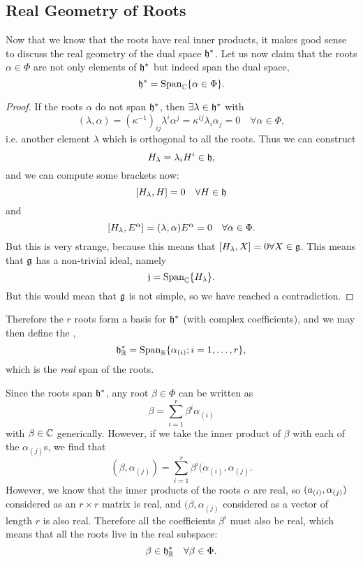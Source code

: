 \subsection*{Real Geometry of Roots} Now that we know that the roots have real inner products, it makes good sense to discuss the real geometry of the dual space $\mathfrak{h}^*$. Let us now claim that the roots $\alpha \in \Phi$ are not only elements of $\mathfrak{h}^*$ but indeed span the dual space,
$$\mathfrak{h}^*=\text{Span}_{\mathbb{C}}\{\alpha\in\Phi\}.$$
\begin{proof}
If the roots $\alpha$ do not span $\mathfrak{h}^*$, then
$\exists \lambda \in \mathfrak{h}^*$ with
$$(\lambda,\alpha)=(\kappa^{-1})_{ij}\lambda^i \alpha^j = \kappa^{ij} \lambda_i \alpha_j=0 \quad \forall \alpha \in \Phi,$$
i.e. another element $\lambda$ which is orthogonal to all the roots. Thus we can construct
$$H_\lambda=\lambda_i H^i \in \mathfrak{h},$$
and we can compute some brackets now:
$$[H_\lambda,H]=0 \quad \forall H\in \mathfrak{h}$$
and
$$[H_\lambda,E^\alpha]=(\lambda,\alpha)E^\alpha =0 \quad \forall \alpha \in \Phi.$$
But this is very strange, because this means that
$[H_\lambda,X]=0\forall X \in \mathfrak{g}$. This means that $\mathfrak{g}$ has a non-trivial ideal, namely
$$\mathfrak{j}=\text{Span}_{\mathbb{C}}\{H_\lambda\}.$$
But this would mean that $\mathfrak{g}$ is not simple, so we have reached a contradiction.
\end{proof}

Therefore the $r$ roots form a basis for $\mathfrak{h}^*$ (with complex coefficients), and we may then define the ,
$$\mathfrak{h}^*_{\mathbb{R}}=\text{Span}_{\mathbb{R}}\{\alpha_{(i)};i=1,\ldots, r\},$$
which is the \emph{real} span of the roots.

Since the roots span $\mathfrak{h}^*$, any root $\beta\in \Phi$ can be written as
$$\beta=\sum_{i=1}^r \beta^i \alpha_{(i)}$$
with $\beta\in \mathbb{C}$ generically. However, if we take the inner product of $\beta$ with each of the $\alpha_{(j)}$s, we find that
$$(\beta,\alpha_{(j)})=\sum_{i=1}^r \beta^i(\alpha_{(i)},\alpha_{(j)}.$$
 However, we know that the inner products of the roots $\alpha$ are real, so $(a_{(i)},\alpha_{(j)})$ considered as an $r\times r$ matrix is real, and $(\beta,\alpha_{(j)}$ considered as a vector of length $r$ is also real. Therefore all the coefficients $\beta^i$ must also be real, which means that all the roots live in the real subspace:
 $$\beta\in \mathfrak{h}^*_{\mathbb{R}} \quad \forall \beta \in \Phi.$$